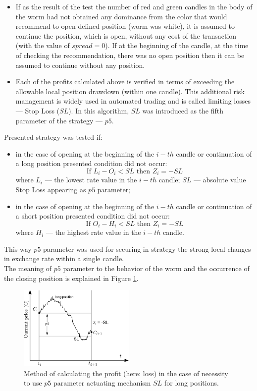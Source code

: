 \documentclass[runningheads,a4paper]{llncs}
\begin{document}
\begin{itemize}
\item If as the result of the test the number of red and green candles in the body of the worm had not obtained any dominance from the color that would recommend to open defined position (worm was white), it is assumed to continue the position, which is open, without any cost of the transaction (with the value of $spread = 0$). If at the beginning of the candle, at the time of checking the recommendation, there was no open position then it can be assumed to continue without any position.
\item Each of the profits calculated above is verified in terms of exceeding the allowable local position drawdown (within one candle). This additional risk management is widely used in automated trading and is called limiting losses --- Stop Loss ($SL$). In this algorithm, $SL$ was introduced as the fifth parameter of the strategy --- $p5$.
\end{itemize}

\noindent Presented strategy was tested if:
\begin{itemize}
\item in the case of opening at the beginning of the $i-th$ candle or continuation of a long position presented condition did not occur:\\
\begin{equation}
\text{If } L_i-O_i<SL \text{ then } Z_i=-SL
\end{equation}
where $L_i$ --– the lowest rate value in the $i-th$ candle; $SL$ --– absolute value Stop Loss appearing as $p5$ parameter;
\item in the case of opening at the beginning of the $i-th$ candle or continuation of a short position presented condition did not occur:
\begin{equation}
\text{If } O_i-H_i<SL \text{ then } Z_i=-SL
\end{equation}
where $H_i$ --– the highest rate value in the $i-th$ candle.
\end{itemize}
This way $p5$ parameter was used for securing in strategy the strong local changes in exchange rate within a single candle.\\
The meaning of $p5$ parameter to the behavior of the worm and the occurrence of the closing position is explained in Figure \ref{fig:fig5}.
\begin{figure}[h!]
\centering
\includegraphics[width = 0.5\textwidth]{figures/rys5.png}
\caption{Method of calculating the profit (here: loss) in the case of necessity to use $p5$ parameter actuating mechanism $SL$ for long positions.}
\label{fig:fig5}
\end{figure}
\FloatBarrier
\end{document}

